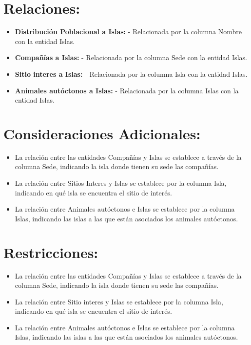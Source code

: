 \documentclass[11pt]{report}
\begin{document}
\section{Relaciones:}

\begin{itemize}
    \item \textbf{Distribución Poblacional a Islas:}
    \subitem - Relacionada por la columna Nombre con la entidad Islas.
    
    \item \textbf{Compañías a Islas:}
    \subitem - Relacionada por la columna Sede con la entidad Islas.

    \item \textbf{Sitio interes a Islas:}
    \subitem - Relacionada por la columna Isla con la entidad Islas.

    \item \textbf{Animales autóctonos a Islas:}
    \subitem - Relacionada por la columna Islas con la entidad Islas.
\end{itemize}

\section{Consideraciones Adicionales:}

\begin{itemize}
    \item La relación entre las entidades Compañías y Islas se establece a través de la columna Sede, indicando la isla donde tienen su sede las compañías.
    \item La relación entre Sitios Interes y Islas se establece por la columna Isla, indicando en qué isla se encuentra el sitio de interés.
    \item La relación entre Animales autóctonos e Islas se establece por la columna Islas, indicando las islas a las que están asociados los animales autóctonos.
\end{itemize}

\section{Restricciones:}

\begin{itemize}
    \item La relación entre las entidades Compañías y Islas se establece a través de la columna Sede, indicando la isla donde tienen su sede las compañías.
    \item La relación entre Sitio interes y Islas se establece por la columna Isla, indicando en qué isla se encuentra el sitio de interés.
    \item La relación entre Animales autóctonos e Islas se establece por la columna Islas, indicando las islas a las que están asociados los animales autóctonos.
\end{itemize}
\end{document}
